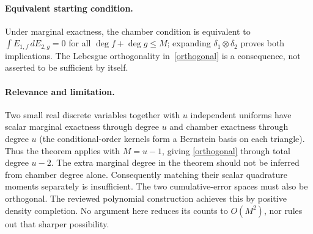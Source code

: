 \documentclass[11pt]{article}
\begin{document}
\paragraph{Equivalent starting condition.}
Under marginal exactness, the chamber condition is equivalent to
$\int E_{1,f}\,dE_{2,g}=0$ for all
$\deg f+\deg g\le M$; expanding $\delta_1\otimes\delta_2$ proves
both implications. The Lebesgue orthogonality in~\eqref{orthogonal}
is a consequence, not asserted to be sufficient by itself.

\paragraph{Relevance and limitation.}
Two small real discrete variables together with $u$ independent uniforms
have scalar marginal exactness through degree $u$ and chamber exactness
through degree $u$ (the conditional-order kernels form a Bernstein basis
on each triangle). Thus the theorem applies with $M=u-1$, giving
\eqref{orthogonal} through total degree $u-2$. The extra marginal degree
in the theorem should not be inferred from chamber degree alone.
Consequently matching their scalar quadrature moments separately is
insufficient. The two cumulative-error spaces must also be orthogonal.
The reviewed polynomial construction achieves this by positive density
completion. No argument here reduces its counts to $O(M^2)$, nor rules
out that sharper possibility.
\end{document}
